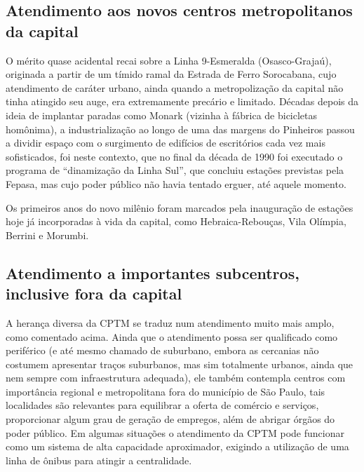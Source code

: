 \documentclass[11pt,fleqn]{book} %
\begin{document}
\subsection{Atendimento aos novos centros metropolitanos da capital}

O mérito quase acidental recai sobre a Linha 9-Esmeralda (Osasco-Grajaú), originada a partir de um tímido ramal da Estrada de Ferro Sorocabana, cujo atendimento de caráter urbano, ainda quando a metropolização da capital não tinha atingido seu auge, era extremamente precário e limitado. Décadas depois da ideia de implantar paradas como Monark (vizinha à fábrica de bicicletas homônima), a industrialização ao longo de uma das margens do Pinheiros passou a dividir espaço com o surgimento de edifícios de escritórios cada vez mais sofisticados, foi neste contexto, que no final da década de 1990 foi executado o programa de “dinamização da Linha Sul”, que concluiu estações previstas pela Fepasa, mas cujo poder público não havia tentado erguer, até aquele momento.

Os primeiros anos do novo milênio foram marcados pela inauguração de estações hoje já incorporadas à vida da capital, como Hebraica-Rebouças, Vila Olímpia, Berrini e Morumbi.

\subsection{Atendimento a importantes subcentros, inclusive fora da capital}

A herança diversa da CPTM se traduz num atendimento muito mais amplo, como comentado acima. Ainda que o atendimento possa ser qualificado como periférico (e até mesmo chamado de suburbano, embora as cercanias não costumem apresentar traços suburbanos, mas sim totalmente urbanos, ainda que nem sempre com infraestrutura adequada), ele também contempla centros com importância regional e metropolitana fora do município de São Paulo, tais localidades são relevantes para equilibrar a oferta de comércio e serviços, proporcionar algum grau de geração de empregos, além de abrigar órgãos do poder público. Em algumas situações o atendimento da CPTM pode funcionar como um sistema de alta capacidade aproximador, exigindo a utilização de uma linha de ônibus para atingir a centralidade.
\end{document}
